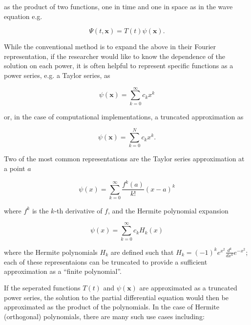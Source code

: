 \documentclass{article}
\renewcommand{\_}{\ifincsname_\else\legacyunderscore\fi}
\begin{document}
    as the product of two functions, one in time and one in space as in the wave equation e.g.

    \begin{equation}
        \Psi(t, \mathbf{x}) = T(t) \psi(\mathbf{x}).
    \end{equation}

    While the conventional method is to expand the above in their Fourier representation, if the researcher would like to know the dependence of the solution on each power, it is often helpful to represent specific functions as a power series, e.g. a Taylor series, as

    \begin{equation}
        \psi(\mathbf{x}) = \sum_{k = 0}^{\infty} c_k x^k
    \end{equation}

    or, in the case of computational implementations, a truncated approximation as 

    \begin{equation}
        \psi(\mathbf{x}) = \sum_{k = 0}^{N} c_k x^k.
    \end{equation}

    Two of the most common representations are the Taylor series approximation at a point $a$
    
    \begin{equation}
        \psi(x) = \sum_{k = 0}^{\infty} \frac{f^k(a)}{k!} (x - a)^k
    \end{equation}

    where $f^k$ is the $k$-th derivative of $f$, and the Hermite polynomial expansion

    \begin{equation}
        \psi(x) = \sum_{k = 0}^{\infty} c_k H_k(x)
    \end{equation}

    where the Hermite polynomials $H_k$ are defined such that $H_k = (-1)^k e^{x^2} \frac{d^k}{dx^k} e^{-x^2}$; each of these representaions can be truncated to provide a sufficient approximation as a ``finite polynomial''.

    If the seperated functions $T(t)$ and $\psi(\mathbf{x})$ are approximated as a truncated power series, the solution to the partial differential equation would then be approximated as the product of the polynomials.  In the case of Hermite (orthogonal) polynomials, there are many such use cases including:
                
\end{document}
